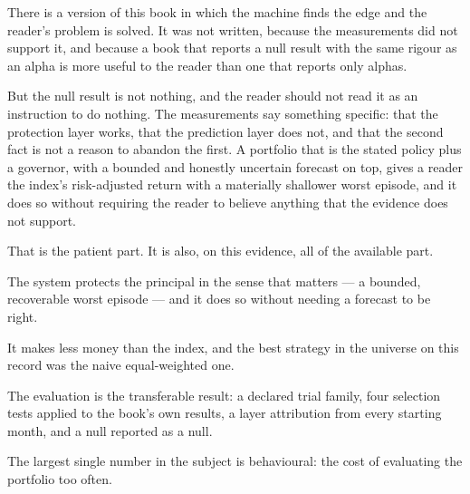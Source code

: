There is a version of this book in which the machine finds the edge and
the reader's problem is solved. It was not written, because the
measurements did not support it, and because a book that reports a null
result with the same rigour as an alpha is more useful to the reader than
one that reports only alphas.

But the null result is not nothing, and the reader should not read it as
an instruction to do nothing. The measurements say something specific:
that the protection layer works, that the prediction layer does not, and
that the second fact is not a reason to abandon the first. A portfolio
that is the stated policy plus a governor, with a bounded and honestly
uncertain forecast on top, gives a reader the index's risk-adjusted
return with a materially shallower worst episode, and it does so without
requiring the reader to believe anything that the evidence does not
support.

That is the patient part. It is also, on this evidence, all of the
available part.

\begin{keytakeaways}
\item The system protects the principal in the sense that matters --- a
bounded, recoverable worst episode --- and it does so without needing a
forecast to be right.
\item It makes less money than the index, and the best strategy in the
universe on this record was the naive equal-weighted one.
\item The evaluation is the transferable result: a declared trial family,
four selection tests applied to the book's own results, a layer
attribution from every starting month, and a null reported as a null.
\item The largest single number in the subject is behavioural: the cost of
evaluating the portfolio too often.
\end{keytakeaways}

